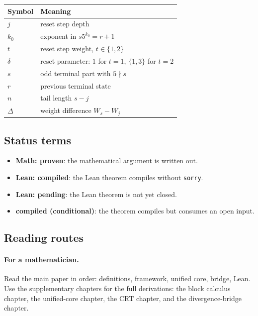 \begin{center}
\small
\begin{tabular}{@{}p{}p{}@{}}
\toprule
Symbol & Meaning \\
\midrule
$j$ & reset step depth \\
$k_0$ & exponent in $s5^{k_0}=r+1$ \\
$t$ & reset step weight, $t\in\{1,2\}$ \\
$\delta$ & reset parameter: $1$ for $t=1$, $\{1,3\}$ for $t=2$ \\
$s$ & odd terminal part with $5\nmid s$ \\
$r$ & previous terminal state \\
$n$ & tail length $s-j$ \\
$\Delta$ & weight difference $W_s-W_j$ \\
\bottomrule
\end{tabular}
\end{center}

\subsection{Status terms}

\begin{itemize}[leftmargin=*]
\item \textbf{Math: proven}: the mathematical argument is written out.
\item \textbf{Lean: compiled}: the Lean theorem compiles without
  \texttt{sorry}.
\item \textbf{Lean: pending}: the Lean theorem is not yet closed.
\item \textbf{compiled (conditional)}: the theorem compiles but
  consumes an open input.
\end{itemize}

\subsection{Reading routes}

\paragraph{For a mathematician.}
Read the main paper in order: definitions, framework, unified core,
bridge, Lean.  Use the supplementary chapters for the full derivations:
the block calculus chapter, the unified-core chapter, the CRT chapter,
and the divergence-bridge chapter.

